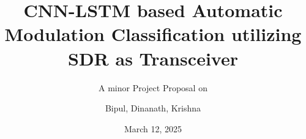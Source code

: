 \subtitle{A minor Project Proposal on }
\title[Real Time AMC]{CNN-LSTM based Automatic Modulation Classification utilizing SDR as Transceiver}
\author[Bipul, Dinanath, Krishna]{Bipul, Dinanath, Krishna}



\newcommand{\slideauthorI}{Bipul Kumar Dahal (THA078BEI009)}
\newcommand{\slideauthorII}{Dinanath Padhya (THA078BEI010)}
\newcommand{\slideauthorIII}{Krishna Acharya (THA078BEI020)}
\newcommand{\slideauthorall}{\slideauthorI, \\ \slideauthorII, \\ \slideauthorIII}
\newcommand{\supervisor}{Er. Dinesh Baniya Kshatri}



\date{March 12, 2025}


